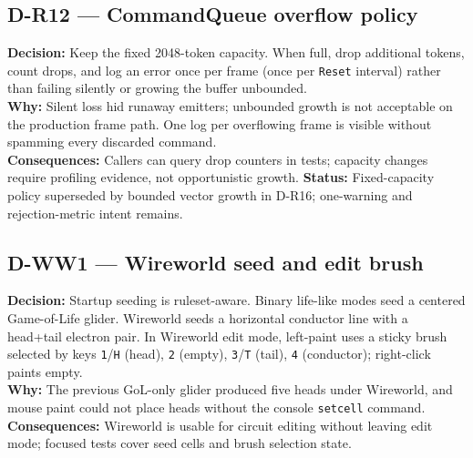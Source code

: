 \subsection*{D-R12 --- CommandQueue overflow policy}
\begin{decisionbox}[title={D-R12 \quad 2026-08-06}]
\textbf{Decision:} Keep the fixed 2048-token  capacity.
When full, drop additional tokens, count drops, and log an error once per
frame (once per \texttt{Reset} interval) rather than failing silently or
growing the buffer unbounded.\\
\textbf{Why:} Silent loss hid runaway emitters; unbounded growth is not
acceptable on the production frame path. One log per overflowing frame is
visible without spamming every discarded command.\\
\textbf{Consequences:} Callers can query drop counters in tests; capacity
changes require profiling evidence, not opportunistic growth.
\textbf{Status:} Fixed-capacity policy superseded by bounded vector growth in
D-R16; one-warning and rejection-metric intent remains.
\end{decisionbox}

\subsection*{D-WW1 --- Wireworld seed and edit brush}
\begin{decisionbox}[title={D-WW1 \quad 2026-08-06}]
\textbf{Decision:} Startup seeding is ruleset-aware. Binary life-like modes seed
a centered Game-of-Life glider. Wireworld seeds a horizontal conductor line
with a head+tail electron pair. In Wireworld edit mode, left-paint uses a
sticky brush selected by keys \texttt{1}/\texttt{H} (head), \texttt{2} (empty),
\texttt{3}/\texttt{T} (tail), \texttt{4} (conductor); right-click paints empty.\\
\textbf{Why:} The previous GoL-only glider produced five heads under Wireworld,
and mouse paint could not place heads without the console \texttt{setcell}
command.\\
\textbf{Consequences:} Wireworld is usable for circuit editing without leaving
edit mode; focused tests cover seed cells and brush selection state.
\end{decisionbox}

